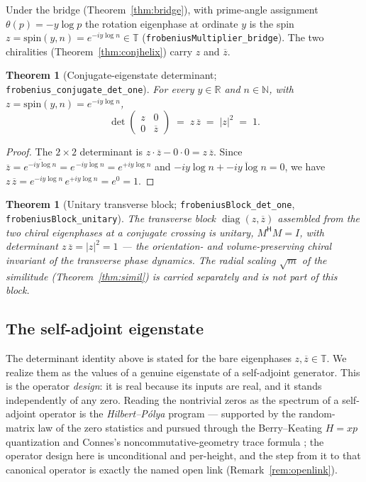 \documentclass[11pt]{article}
\newtheorem{theorem}[definition]{Theorem}
\DeclareMathOperator{\diag}{diag}
\newcommand{\R}{\mathbb{R}}
\newcommand{\N}{\mathbb{N}}
\newcommand{\T}{\mathbb{T}}
\newcommand{\conj}[1]{\overline{#1}}
\newcommand{\code}[1]{\texttt{#1}}
\begin{document}
Under the bridge (Theorem~\ref{thm:bridge}), with prime-angle assignment $\theta(p)=-y\log p$ the
rotation eigenphase at ordinate $y$ is the spin $z=\mathrm{spin}(y,n)=e^{-iy\log n}\in\T$
(\code{frobeniusMultiplier\_bridge}). The two chiralities (Theorem~\ref{thm:conjhelix}) carry
$z$ and $\conj z$.

\begin{theorem}[Conjugate-eigenstate determinant; \code{frobenius\_conjugate\_det\_one}]\label{thm:det}
For every $y\in\R$ and $n\in\N$, with $z=\mathrm{spin}(y,n)=e^{-iy\log n}$,
\[
  \det
  \begin{pmatrix} z & 0\\[2pt] 0 & \conj z \end{pmatrix}
  \;=\; z\,\conj z \;=\; |z|^2 \;=\; 1 .
\]
\end{theorem}

\begin{proof}
The $2\times2$ determinant is $z\cdot\conj z-0\cdot0=z\,\conj z$. Since $\conj z=\conj{e^{-iy\log n}}
=e^{\,\conj{-iy\log n}}=e^{+iy\log n}$ and $-iy\log n+\overline{-iy\log n}=0$, we have
$z\,\conj z=e^{-iy\log n}\,e^{+iy\log n}=e^{0}=1$.
\end{proof}

\begin{theorem}[Unitary transverse block; \code{frobeniusBlock\_det\_one}, \code{frobeniusBlock\_unitary}]\label{thm:unitary}
The transverse block $\diag(z,\conj z)$ assembled from the two chiral eigenphases at a conjugate
crossing is \emph{unitary}, $M^{\mathsf H}M=I$, with determinant $z\,\conj z=|z|^2=1$ --- the
orientation- and volume-preserving chiral invariant of the transverse phase dynamics. The radial
scaling $\sqrt m$ of the similitude (Theorem~\ref{thm:simil}) is carried separately and is not part of
this block.
\end{theorem}

\subsection{The self-adjoint eigenstate}\label{sub:eigenstate}

The determinant identity above is stated for the bare eigenphases $z,\conj z\in\T$. We realize them
as the values of a genuine eigenstate of a self-adjoint generator. This is the operator
\emph{design}: it is real because its inputs are real, and it stands independently of any zero.
Reading the nontrivial zeros as the spectrum of a self-adjoint operator is the
\emph{Hilbert--P\'olya} program --- supported by the random-matrix law of the zero statistics
\cite{Montgomery1973} and pursued through the Berry--Keating $H=xp$ quantization
\cite{BerryKeating1999} and Connes's noncommutative-geometry trace formula \cite{Connes1999}; the
operator design here is unconditional and per-height, and the step from it to that canonical
operator is exactly the named open link (Remark~\ref{rem:openlink}).
\end{document}
